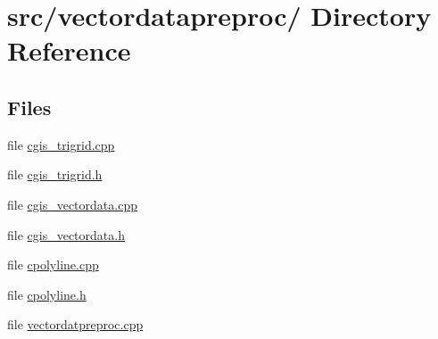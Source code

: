 \hypertarget{dir_000003}{
\section{src/vectordatapreproc/ Directory Reference}
\label{dir_000003}
}
\subsection*{Files}
\begin{CompactItemize}
\item 
file \hyperlink{cgis__trigrid_8cpp}{cgis\_\-trigrid.cpp}
\item 
file \hyperlink{cgis__trigrid_8h}{cgis\_\-trigrid.h}
\item 
file \hyperlink{cgis__vectordata_8cpp}{cgis\_\-vectordata.cpp}
\item 
file \hyperlink{cgis__vectordata_8h}{cgis\_\-vectordata.h}
\item 
file \hyperlink{cpolyline_8cpp}{cpolyline.cpp}
\item 
file \hyperlink{cpolyline_8h}{cpolyline.h}
\item 
file \hyperlink{vectordatpreproc_8cpp}{vectordatpreproc.cpp}
\end{CompactItemize}

